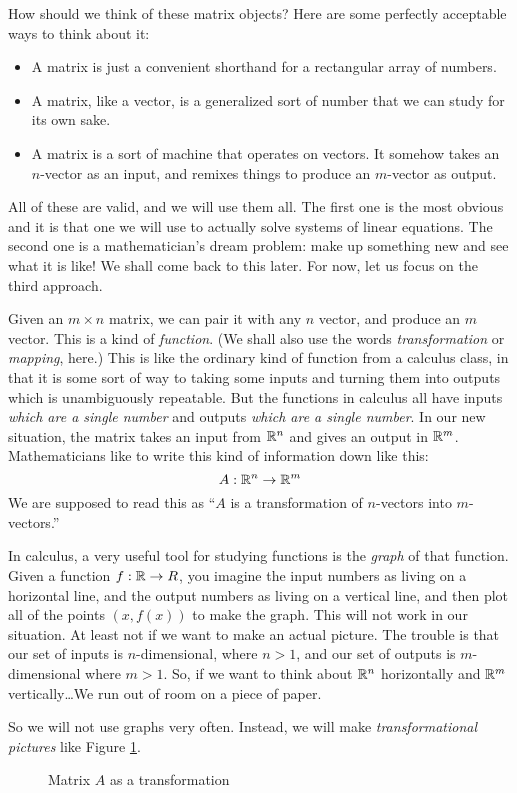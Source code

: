 \documentclass[00-livre-main.tex]{subfiles}
\begin{document}
How should we think of these matrix objects? Here are some perfectly acceptable ways to think about it:
\begin{itemize}
\item A matrix is just a convenient shorthand for a rectangular array of numbers.
\item A matrix, like a vector, is a generalized sort of number that we can study for its own sake.
\item A matrix is a sort of machine that operates on vectors. It somehow takes an $n$-vector as an input, and remixes things to produce an $m$-vector as output.
\end{itemize}
All of these are valid, and we will use them all. The first one is the most obvious and it is that one we will use to actually solve systems of linear equations. The second one is a mathematician's dream problem: make up something new and see what it is like! We shall come back to this later. For now, let us focus on the third approach.

Given an $m\times n$ matrix, we can pair it with any $n$ vector, and produce an $m$ vector. This is a kind of \emph{function}. (We shall also use the words \emph{transformation} or \emph{mapping}, here.) This is like the ordinary kind of function from a calculus class, in that it is some sort of way to taking some inputs and turning them into outputs which is unambiguously repeatable. But the functions in calculus all have inputs \emph{which are a single number} and outputs \emph{which are a single number}. In our new situation, the matrix takes an input from $\mathbb{R}^n$ and gives an output in $\mathbb{R}^m$. Mathematicians like to write this kind of information down like this:
\[
A : \mathbb{R}^n \rightarrow \mathbb{R}^m
\]
We are supposed to read this as ``$A$ is a transformation of $n$-vectors into $m$-vectors.''

In calculus, a very useful tool for studying functions is the \emph{graph} of that function. Given a function $f:\mathbb{R} \rightarrow R$, you imagine the input numbers as living on a horizontal line, and the output numbers as living on a vertical line, and then plot all of the points $(x, f(x))$ to make the graph.  This will not work in our situation. At least not if we want to make an actual picture. The trouble is that our set of inputs is $n$-dimensional, where $n>1$, and our set of outputs is $m$-dimensional where $m>1$. So, if we want to think about $\mathbb{R}^n$ horizontally and $\mathbb{R}^m$ vertically\dots We run out of room on a piece of paper.

So we will not use graphs very often. Instead, we will make \emph{transformational pictures} like Figure \ref{fig:trans-pic-1}.
\begin{figure}[h]
\centering
{}
\caption{Matrix $A$ as a transformation}
\label{fig:trans-pic-1}
\end{figure}
\end{document}
